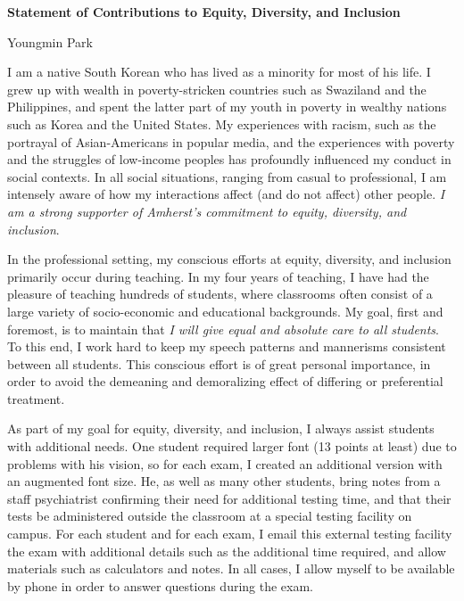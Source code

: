 \documentclass[a4paper,11pt]{article}
\begin{document}
\begin{center}
\Large \textbf{Statement of Contributions to Equity, Diversity, and Inclusion}

\Large Youngmin Park
\end{center}

I am a native South Korean who has lived as a minority for most of his life. I grew up with wealth in poverty-stricken countries such as Swaziland and the Philippines, and spent the latter part of my youth in poverty in wealthy nations such as Korea and the United States. My experiences with racism, such as the portrayal of Asian-Americans in popular media, and the experiences with poverty and the struggles of low-income peoples has profoundly influenced my conduct in social contexts. In all social situations, ranging from casual to professional, I am intensely aware of how my interactions affect (and do not affect) other people. \textit{I am a strong supporter of Amherst's commitment to equity, diversity, and inclusion}.

In the professional setting, my conscious efforts at equity, diversity, and inclusion primarily occur during teaching. In my four years of teaching, I have had the pleasure of teaching hundreds of students, where classrooms often consist of a large variety of socio-economic and educational backgrounds. My goal, first and foremost, is to maintain that \textit{I will give equal and absolute care to all students}. To this end, I work hard to keep my speech patterns and mannerisms consistent between all students. This conscious effort is of great personal importance, in order to avoid the demeaning and demoralizing effect of differing or preferential treatment.

As part of my goal for equity, diversity, and inclusion, I always assist students with additional needs. One student required larger font (13 points at least) due to problems with his vision, so for each exam, I created an additional version with an augmented font size. He, as well as many other students, bring notes from a staff psychiatrist confirming their need for additional testing time, and that their tests be administered outside the classroom at a special testing facility on campus. For each student and for each exam, I email this external testing facility the exam with additional details such as the additional time required, and allow materials such as calculators and notes. In all cases, I allow myself to be available by phone in order to answer questions during the exam.
\end{document}

